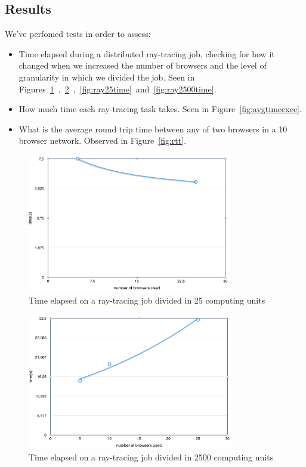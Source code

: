 \subsection{Results}

We've perfomed tests in order to assess:

\begin{itemize}
    \item Time elapsed during a distributed ray-tracing job, checking for how it changed when we increased the number of browsers and the level of granularity in which we divided the job. Seen in Figures~\ref{fig:ray25}~,~\ref{fig:ray2500}~,~\ref{fig:ray25time}~and~\ref{fig:ray2500time}.
    \item How much time each ray-tracing task takes. Seen in Figure~\ref{fig:avgtimeexec}.
    \item What is the average round trip time between any of two browsers in a 10 browser network. Observed in Figure~\ref{fig:rtt}.
\end{itemize}

\begin{figure}[h!]
  \centering
  \includegraphics[width=0.8\textwidth]{figs/2.png}
  \caption{Time elapsed on a ray-tracing job divided in 25 computing units}
  \label{fig:ray25}
\end{figure}

\begin{figure}[h!]
  \centering
  \includegraphics[width=0.8\textwidth]{figs/1.png}
  \caption{Time elapsed on a ray-tracing job divided in 2500 computing units}
  \label{fig:ray2500}
\end{figure}


